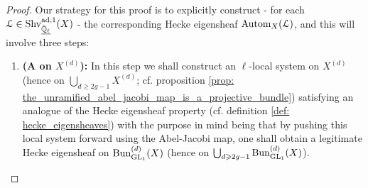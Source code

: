             \begin{proof}
                Our strategy for this proof is to explicitly construct - for each $\mathcal{L} \in \mathrm{Shv}_{\underline{\bar{\mathbb{Q}}_{\ell}}}^{\mathrm{ad}, 1}(X)$ - the corresponding Hecke eigensheaf $\mathrm{Autom}_X(\mathcal{L})$, and this will involve three steps:
                    \begin{enumerate}
                        \item \textbf{(A  on $X^{(d)}$):} In this step we shall construct an $\ell$-local system on $X^{(d)}$ (hence on $\bigcup_{d \geq 2g - 1} X^{(d)}$; cf. proposition \ref{prop: the_unramified_abel_jacobi_map_is_a_projective_bundle}) satisfying an analogue of the Hecke eigensheaf property (cf. definition \ref{def: hecke_eigensheaves}) with the purpose in mind being that by pushing this local system forward using the Abel-Jacobi map, one shall obtain a legitimate Hecke eigensheaf on $\mathrm{Bun}_{\operatorname{GL}_1}^{(d)}(X)$ (hence on $\bigcup_{d \geqslant 2g - 1} \mathrm{Bun}_{\operatorname{GL}_1}^{(d)}(X)$).
                        

\end{enumerate}
\end{proof}
